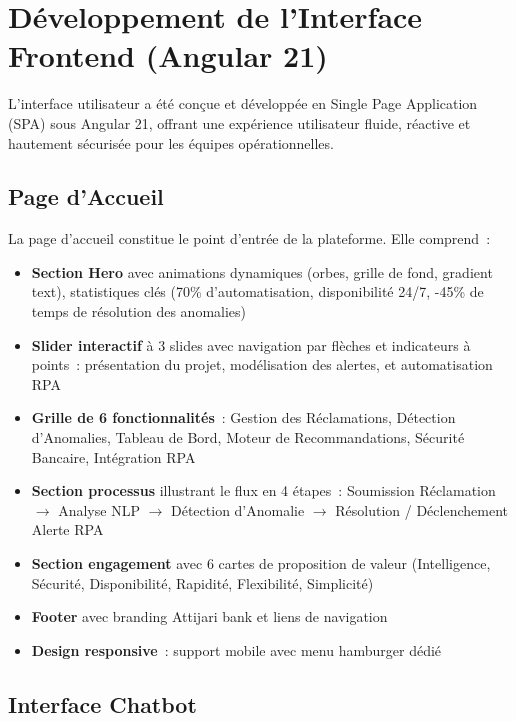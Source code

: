 \documentclass[12pt,a4paper]{report}
\begin{document}
\section{Développement de l'Interface Frontend (Angular 21)}

L'interface utilisateur a été conçue et développée en Single Page Application (SPA) sous Angular 21, offrant une expérience utilisateur fluide, réactive et hautement sécurisée pour les équipes opérationnelles.

\subsection{Page d'Accueil}

La page d'accueil constitue le point d'entrée de la plateforme. Elle comprend~:

\begin{itemize}[noitemsep]
    \item \textbf{Section Hero} avec animations dynamiques (orbes, grille de fond, gradient text), statistiques clés (70\% d'automatisation, disponibilité 24/7, -45\% de temps de résolution des anomalies)
    \item \textbf{Slider interactif} à 3 slides avec navigation par flèches et indicateurs à points~: présentation du projet, modélisation des alertes, et automatisation RPA
    \item \textbf{Grille de 6 fonctionnalités}~: Gestion des Réclamations, Détection d'Anomalies, Tableau de Bord, Moteur de Recommandations, Sécurité Bancaire, Intégration RPA
    \item \textbf{Section processus} illustrant le flux en 4 étapes~: Soumission Réclamation $\rightarrow$ Analyse NLP $\rightarrow$ Détection d'Anomalie $\rightarrow$ Résolution / Déclenchement Alerte RPA
    \item \textbf{Section engagement} avec 6 cartes de proposition de valeur (Intelligence, Sécurité, Disponibilité, Rapidité, Flexibilité, Simplicité)
    \item \textbf{Footer} avec branding Attijari bank et liens de navigation
    \item \textbf{Design responsive}~: support mobile avec menu hamburger dédié
\end{itemize}

\subsection{Interface Chatbot}
\end{document}
